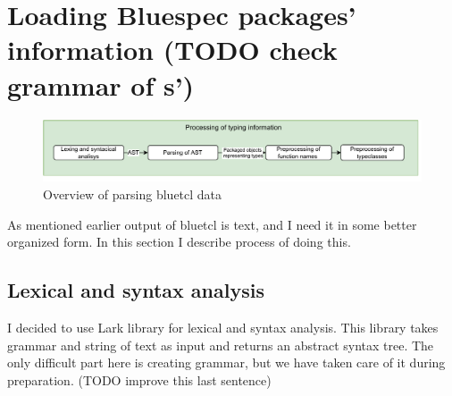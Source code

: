 \documentclass[14pt]{report}
\begin{document}
\section{Loading Bluespec packages' information (TODO check grammar of s')}
\begin{figure}[!h]
    \centering
    \caption{Overview of parsing bluetcl data}

    \includegraphics[width=1.0\columnwidth]{pdfExports/LargeMapProcessing.pdf}
\end{figure}
As mentioned earlier output of bluetcl is text, and I need it in some better organized form. In this section I describe process of doing this.
\subsection{Lexical and syntax analysis}
I decided to use Lark library for lexical and syntax analysis. This library takes grammar and string of text as input and returns an abstract syntax tree. The only difficult part here is creating grammar, but we have taken care of it during preparation. (TODO improve this last sentence)
\end{document}
